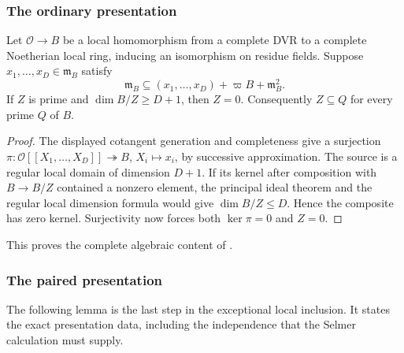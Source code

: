 \subsubsection{The ordinary presentation}
\begin{srlemma}\label{lem:sr-ordinary-presentation-prime}
Let $\mathcal O\to B$ be a local homomorphism from a complete DVR to
a complete Noetherian local ring, inducing an isomorphism on residue
fields. Suppose $x_1,\ldots,x_D\in\mathfrak m_B$ satisfy
\[
            \mathfrak m_B\subseteq
                 (x_1,\ldots,x_D)+\varpi B+\mathfrak m_B^2.
\]
If $Z$ is prime and $\dim B/Z\ge D+1$, then $Z=0$.
Consequently $Z\subseteq Q$ for every prime $Q$ of $B$.
\end{srlemma}
\begin{proof}
The displayed cotangent generation and completeness give a surjection
$\pi:\mathcal O[[X_1,\ldots,X_D]]\twoheadrightarrow B$,
$X_i\mapsto x_i$, by successive approximation.
The source is a regular local domain of dimension $D+1$.
If its kernel after composition with $B\to B/Z$ contained a nonzero
element, the principal ideal theorem and the regular local dimension
formula would give $\dim B/Z\le D$.
Hence the composite has zero kernel.
Surjectivity now forces both $\ker\pi=0$ and $Z=0$.
\end{proof}
This proves the complete algebraic content of .

\subsubsection{The paired presentation}
The following lemma is the last step in the exceptional local
inclusion. It states the exact presentation data, including the
independence that the Selmer calculation must supply.

